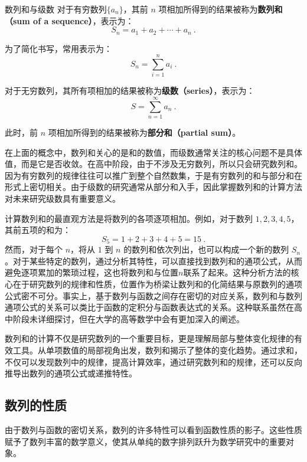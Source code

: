 \begin{definition}{数列和与级数}
对于有穷数列$\{a_n\}$，其前 $n$ 项相加所得到的结果被称为\textbf{数列和（sum of a sequence）}，表示为：
\begin{equation}
S_n = a_1 + a_2 + \cdots + a_n~.
\end{equation}

为了简化书写，常用表示为：
\begin{equation}
S_n = \sum_{i=1}^n a_i~.
\end{equation}

对于无穷数列，其所有项相加的结果被称为\textbf{级数（series）}，表示为：
\begin{equation}
S = \sum_{n=1}^\infty a_n~.
\end{equation}

此时，前 $n$ 项相加所得到的结果被称为\textbf{部分和（partial sum）}。
\end{definition}

在上面的概念中，数列和关心的是和的数值，而级数通常关注的核心问题不是具体值，而是它是否收敛。在高中阶段，由于不涉及无穷数列，所以只会研究数列和。因为有穷数列的规律往往可以推广到整个自然数集，于是有穷数列的和与部分和在形式上密切相关。由于级数的研究通常从部分和入手，因此掌握数列和的计算方法对未来研究级数具有重要意义。

计算数列和的最直观方法是将数列的各项逐项相加。例如，对于数列 $1, 2, 3, 4, 5$，其前五项的和为：
$$
S_5 = 1 + 2 + 3 + 4 + 5 = 15~.
$$
然而，对于每个 $n$，将从 $1$ 到 $n$ 的数列和依次列出，也可以构成一个新的数列 ${S_n}$。对于某些特定的数列，通过分析其特性，可以直接找到数列和的通项公式，从而避免逐项累加的繁琐过程，这也将数列和与位置$n$联系了起来。这种分析方法的核心在于研究数列的规律和性质，位置作为桥梁让数列和的化简结果与原数列的通项公式密不可分。事实上，基于数列与函数之间存在密切的对应关系，数列和与数列通项公式的关系可以类比于函数的定积分与函数表达式的关系。这种联系虽然在高中阶段未详细探讨，但在大学的高等数学中会有更加深入的阐述。

数列和的计算不仅是研究数列的一个重要目标，更是理解局部与整体变化规律的有效工具。从单项数值的局部视角出发，数列和揭示了整体的变化趋势。通过求和，不仅可以发现数列中的规律，提高计算效率，通过研究数列和的规律，还可以反向推导出数列的通项公式或递推特性。

\subsection{数列的性质}

由于数列与函数的密切关系，数列的许多特性可以看到函数性质的影子。这些性质赋予了数列丰富的数学意义，使其从单纯的数字排列跃升为数学研究中的重要对象。

